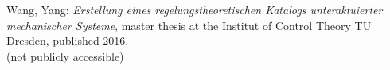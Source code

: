 \documentclass[10pt,a4paper]{article}
\begin{document}
	
	\begin{thebibliography}{10}		
		Wang, Yang: 
		\textit{Erstellung eines regelungstheoretischen Katalogs unteraktuierter mechanischer Systeme}, master thesis at the Institut of Control Theory TU Dresden, published 2016. \\
		(not publicly accessible)
	\end{thebibliography}
\end{document}
